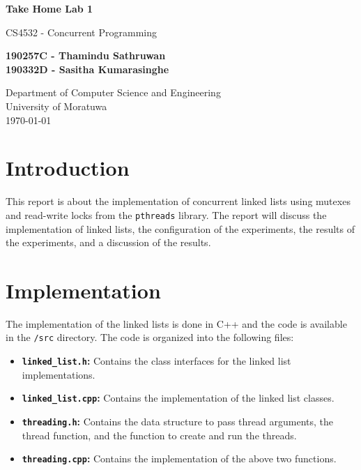 \documentclass[a4paper,12pt]{article}
\begin{document}
\begin{titlepage}
    \begin{center}
        \vspace*{1cm}

        \LARGE
        \textbf{Take Home Lab 1}

        \vspace{0.5cm}

        \large
        CS4532 - Concurrent Programming

        \vspace{1.5cm}

        \textbf{190257C - Thamindu Sathruwan\\190332D - Sasitha Kumarasinghe}

        \vfill

        \normalsize
        Department of Computer Science and Engineering\\
        University of Moratuwa\\
        \today

    \end{center}
\end{titlepage}

\tableofcontents
\newpage

\section{Introduction}

This report is about the implementation of concurrent linked lists using mutexes and read-write locks from the \lstinline|pthreads| library. The report will discuss the implementation of linked lists, the configuration of the experiments, the results of the experiments, and a discussion of the results.

\section{Implementation}

The implementation of the linked lists is done in C++ and the code is available in the \lstinline|/src| directory. The code is organized into the following files:

\begin{itemize}
    \itemsep 0em
    \item \textbf{\lstinline|linked_list.h|:} Contains the class interfaces for the linked list implementations.
    \item \textbf{\lstinline|linked_list.cpp|:} Contains the implementation of the linked list classes.
    \item \textbf{\lstinline|threading.h|:} Contains the data structure to pass thread arguments, the thread function, and the function to create and run the threads.
    \item \textbf{\lstinline|threading.cpp|:} Contains the implementation of the above two functions.
\end{itemize}
\end{document}
